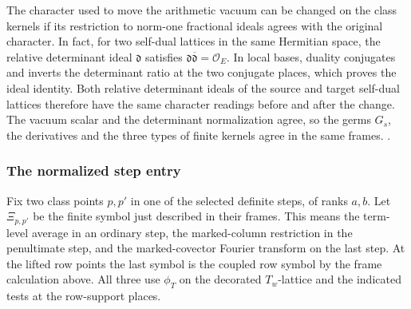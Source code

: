 The character used to move the arithmetic vacuum can be
changed on the class kernels if its restriction to norm-one
fractional ideals agrees with the original character. In
fact, for two self-dual lattices in the same Hermitian space,
the relative determinant ideal \(\mathfrak d\) satisfies
\(\mathfrak d\overline{\mathfrak d}=\mathcal O_E\).
In local bases, duality conjugates and inverts the
determinant ratio at the two conjugate places, which proves
the ideal identity. Both relative determinant ideals
of the source and target self-dual lattices therefore have
the same character readings before and after the change.
The vacuum scalar and the determinant normalization agree,
so the germs \(G_s\), the derivatives and the three types of
finite kernels agree in the same frames.
.

\subsubsection{The normalized step entry}\label{sec:period-normalized-entry}

Fix two class points \(p,p'\) in one of the selected
definite steps, of ranks \(a,b\). Let \(\Xi_{p,p'}\) be
the finite symbol just described in their frames. This
means the term-level average in an ordinary step, the
marked-column restriction in the penultimate step,
and the marked-covector Fourier transform on the
last step. At the lifted row points the last symbol
is the coupled row symbol by the frame calculation above.
All three use \(\phi_T\) on the decorated \(T_w\)-lattice
and the indicated tests at the row-support places.

